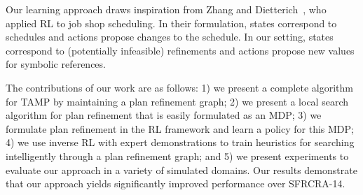 Our learning approach draws inspiration
from Zhang and Dietterich~\cite{JobShopSched}, who applied RL to job
shop scheduling. In their formulation, states correspond to schedules
and actions propose changes to the schedule. In our setting, states
correspond to (potentially infeasible) refinements and actions propose
new values for symbolic references.

The contributions of our work are as follows: 1) we present a complete
algorithm for TAMP by maintaining a plan refinement graph; 2) we
present a local search algorithm for plan refinement that is easily
formulated as an MDP; 3) we formulate plan refinement in the RL
framework and learn a policy for this MDP; 4) we use inverse RL with
expert demonstrations to train heuristics for
searching intelligently through a plan refinement graph; and 5) we
present experiments to evaluate our approach in a variety of simulated
domains. Our results demonstrate that our approach yields
significantly improved performance over SFRCRA-14.
